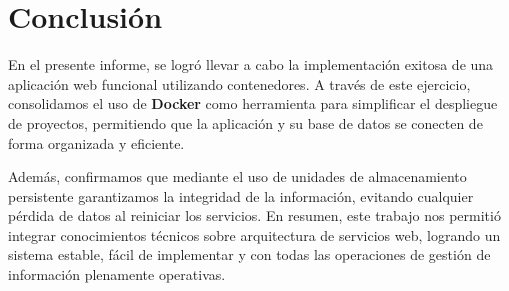 \chapter{Conclusión}
En el presente informe, se logró llevar a cabo la implementación exitosa de una aplicación web funcional utilizando contenedores. A través de este ejercicio, consolidamos el uso de \textbf{Docker} como herramienta para simplificar el despliegue de proyectos, permitiendo que la aplicación y su base de datos se conecten de forma organizada y eficiente.

Además, confirmamos que mediante el uso de unidades de almacenamiento persistente garantizamos la integridad de la información, evitando cualquier pérdida de datos al reiniciar los servicios. En resumen, este trabajo nos permitió integrar conocimientos técnicos sobre arquitectura de servicios web, logrando un sistema estable, fácil de implementar y con todas las operaciones de gestión de información plenamente operativas.
